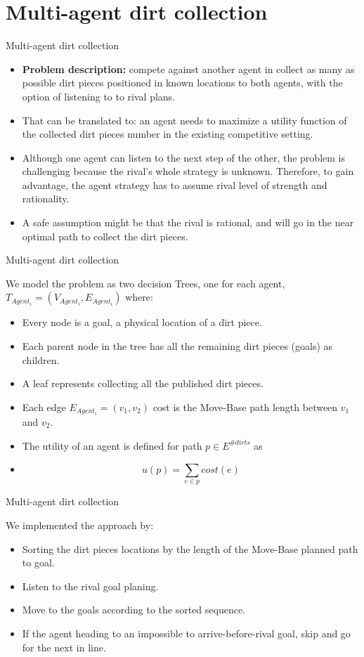 \documentclass[10pt]{beamer}
\begin{document}
\section{Multi-agent dirt collection}
\begin{frame}{Multi-agent dirt collection}
\begin{itemize}
    \item {\bf Problem description:} compete against another agent in collect as many as possible dirt pieces positioned in known locations to both agents, with the option of listening to to rival plans. 
    \item That can be translated to: an agent needs to maximize a utility function of the collected dirt pieces number in the existing competitive setting.
    \item Although one agent can listen to the next step of the other, the problem is challenging because the rival's whole strategy is unknown. Therefore, to gain advantage, the agent strategy has to assume rival level of strength and rationality.
    \item A safe assumption might be that the rival is rational, and will go in the near optimal path to collect the dirt pieces.
\end{itemize}
\end{frame}


\begin{frame}{Multi-agent dirt collection}

We model the problem as two decision Trees, one for each agent, $T_{Agent_{i}} = (V_{Agent_{i}},E_{Agent_{i}})$ where:
\begin{itemize}
\item Every node is a goal, a physical location of a dirt piece.
\item Each parent node in the tree has all the remaining dirt pieces (goals) as children.
\item A leaf represents collecting all the published dirt pieces.
\item Each edge $E_{Agent_{i}}=(v_{1},v_{2})$ cost is the Move-Base path length between $v_{1}$ and $v_{2}$.
\item The utility of an agent is defined for path $p\in E^{\# dirts}$ as
\item $$u(p) = \sum_{e \in p} cost(e) $$
\end{itemize}
\end{frame}


\begin{frame}{Multi-agent dirt collection}

We implemented the approach by:
\begin{itemize}
\item Sorting the dirt pieces locations by the length of the Move-Base planned path to goal.
\item Listen to the rival goal planing.
\item Move to the goals according to the sorted sequence.
\item If the agent heading to an impossible to arrive-before-rival goal, skip and go for the next in line.

\end{itemize}
\end{frame}
\end{document}
